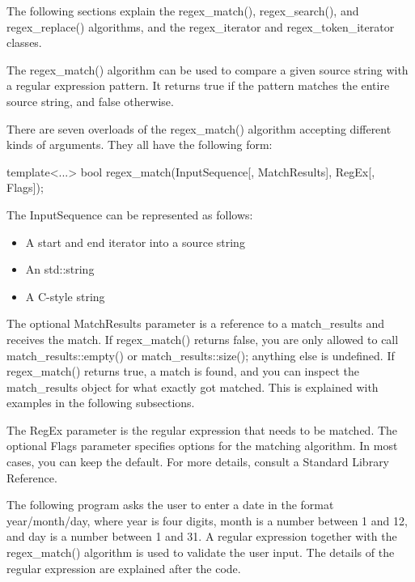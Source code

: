 The following sections explain the regex\_match(), regex\_search(), and regex\_replace() algorithms, and the regex\_iterator and regex\_token\_iterator classes.


The regex\_match() algorithm can be used to compare a given source string with a regular expression pattern. It returns true if the pattern matches the entire source string, and false otherwise.

There are seven overloads of the regex\_match() algorithm accepting different kinds of arguments.
They all have the following form:

\begin{cpp}
template<...>
bool regex_match(InputSequence[, MatchResults], RegEx[, Flags]);
\end{cpp}

The InputSequence can be represented as follows:

\begin{itemize}
\item
A start and end iterator into a source string

\item
An std::string

\item
A C-style string
\end{itemize}

The optional MatchResults parameter is a reference to a match\_results and receives the match. If regex\_match() returns false, you are only allowed to call match\_results::empty() or match\_results::size(); anything else is undefined. If regex\_match() returns true, a match is found, and you can inspect the match\_results object for what exactly got matched. This is explained with examples in the following subsections.

The RegEx parameter is the regular expression that needs to be matched. The optional Flags parameter specifies options for the matching algorithm. In most cases, you can keep the default. For more details, consult a Standard Library Reference.


The following program asks the user to enter a date in the format year/month/day, where year is four digits, month is a number between 1 and 12, and day is a number between 1 and 31. A regular expression together with the regex\_match() algorithm is used to validate the user input. The details of the regular expression are explained after the code.

